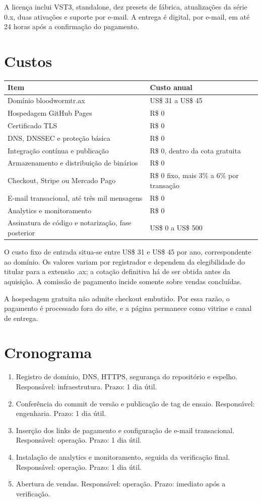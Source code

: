 ﻿\documentclass[11pt,a4paper]{article}
\begin{document}
A licença inclui VST3, standalone, dez presets de fábrica, atualizações da série 0.x, duas ativações e suporte por e-mail. A entrega é digital, por e-mail, em até 24 horas após a confirmação do pagamento.

\section{Custos}

\begin{tabular}{|p{7.9cm}|p{5.7cm}|}
\hline
Item & Custo anual \\
\hline
Domínio bloodwormtr.ax & US\$ 31 a US\$ 45 \\
Hospedagem GitHub Pages & R\$ 0 \\
Certificado TLS & R\$ 0 \\
DNS, DNSSEC e proteção básica & R\$ 0 \\
Integração contínua e publicação & R\$ 0, dentro da cota gratuita \\
Armazenamento e distribuição de binários & R\$ 0 \\
Checkout, Stripe ou Mercado Pago & R\$ 0 fixo, mais 3\% a 6\% por transação \\
E-mail transacional, até três mil mensagens & R\$ 0 \\
Analytics e monitoramento & R\$ 0 \\
Assinatura de código e notarização, fase posterior & US\$ 0 a US\$ 500 \\
\hline
\end{tabular}

O custo fixo de entrada situa-se entre US\$ 31 e US\$ 45 por ano, correspondente ao domínio. Os valores variam por registrador e dependem da elegibilidade do titular para a extensão .ax; a cotação definitiva há de ser obtida antes da aquisição. A comissão de pagamento incide somente sobre vendas concluídas.

A hospedagem gratuita não admite checkout embutido. Por essa razão, o pagamento é processado fora do site, e a página permanece como vitrine e canal de entrega.

\section{Cronograma}

\begin{enumerate}[label=Fase \arabic*.]
\item Registro de domínio, DNS, HTTPS, segurança do repositório e espelho. Responsável: infraestrutura. Prazo: 1 dia útil.
\item Conferência do commit de versão e publicação de tag de ensaio. Responsável: engenharia. Prazo: 1 dia útil.
\item Inserção dos links de pagamento e configuração de e-mail transacional. Responsável: operação. Prazo: 1 dia útil.
\item Instalação de analytics e monitoramento, seguida da verificação final. Responsável: operação. Prazo: 1 dia útil.
\item Abertura de vendas. Responsável: operação. Prazo: imediato após a verificação.
\end{enumerate}
\end{document}
